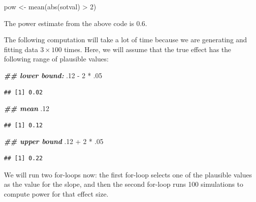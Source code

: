 \documentclass[
  12pt,
]{krantz}
\newenvironment{Shaded}{\begin{snugshade}}{\end{snugshade}}
\newcommand{\DecValTok}[1]{\textcolor[rgb]{0.00,0.00,0.81}{#1}}
\newcommand{\DocumentationTok}[1]{\textcolor[rgb]{0.56,0.35,0.01}{\textbf{\textit{#1}}}}
\newcommand{\FunctionTok}[1]{\textcolor[rgb]{0.00,0.00,0.00}{#1}}
\newcommand{\NormalTok}[1]{#1}
\newcommand{\OtherTok}[1]{\textcolor[rgb]{0.56,0.35,0.01}{#1}}
\newcommand{\SpecialCharTok}[1]{\textcolor[rgb]{0.00,0.00,0.00}{#1}}
\theoremstyle{definition}
\theoremstyle{definition}
\theoremstyle{definition}
\theoremstyle{definition}
\theoremstyle{remark}
\begin{document}
\begin{Shaded}
\begin{Highlighting}[]
\NormalTok{pow }\OtherTok{\textless{}{-}} \FunctionTok{mean}\NormalTok{(}\FunctionTok{abs}\NormalTok{(sotval) }\SpecialCharTok{\textgreater{}} \DecValTok{2}\NormalTok{)}
\end{Highlighting}
\end{Shaded}

The power estimate from the above code is 0.6.

The following computation will take a lot of time because we are generating and fitting data \(3\times 100\) times.
Here, we will assume that the true effect has the following range of plausible values:

\begin{Shaded}
\begin{Highlighting}[]
\DocumentationTok{\#\# lower bound:}
\NormalTok{.}\DecValTok{12} \SpecialCharTok{{-}} \DecValTok{2} \SpecialCharTok{*}\NormalTok{ .}\DecValTok{05}
\end{Highlighting}
\end{Shaded}

\begin{verbatim}
## [1] 0.02
\end{verbatim}

\begin{Shaded}
\begin{Highlighting}[]
\DocumentationTok{\#\# mean}
\NormalTok{.}\DecValTok{12}
\end{Highlighting}
\end{Shaded}

\begin{verbatim}
## [1] 0.12
\end{verbatim}

\begin{Shaded}
\begin{Highlighting}[]
\DocumentationTok{\#\# upper bound}
\NormalTok{.}\DecValTok{12} \SpecialCharTok{+} \DecValTok{2} \SpecialCharTok{*}\NormalTok{ .}\DecValTok{05}
\end{Highlighting}
\end{Shaded}

\begin{verbatim}
## [1] 0.22
\end{verbatim}

We will run two for-loops now: the first for-loop selects one of the plausible values as the value for the slope, and then the second for-loop runs 100 simulations to compute power for that effect size.
\end{document}
